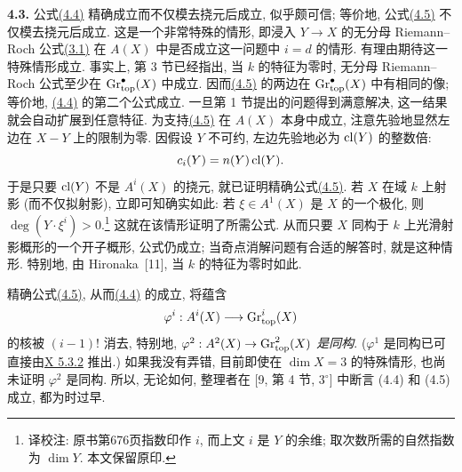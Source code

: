 \noindent{}\textbf{4.3.}
公式\hyperlink{sga6.e14.eq.4-4}{(4.4)} 精确成立而不仅模去挠元后成立, 似乎颇可信; 等价地, 公式\hyperlink{sga6.e14.eq.4-5}{(4.5)} 不仅模去挠元后成立. 这是一个非常特殊的情形, 即浸入 $Y\to X$ 的无分母 Riemann--Roch 公式\hyperlink{sga6.e14.eq.3-1}{(3.1)} 在 $A(X)$ 中是否成立这一问题中 $i=d$ 的情形. 有理由期待这一特殊情形成立. 事实上, 第 3 节已经指出, 当 $k$ 的特征为零时, 无分母 Riemann--Roch 公式至少在 $\operatorname{Gr}_{\mathrm{top}}^\bullet(X)$ 中成立. 因而\hyperlink{sga6.e14.eq.4-5}{(4.5)} 的两边在 $\operatorname{Gr}_{\mathrm{top}}^\bullet(X)$ 中有相同的像; 等价地, \hyperlink{sga6.e14.eq.4-4}{(4.4)} 的第二个公式成立. 一旦第 1 节提出的问题得到满意解决, 这一结果就会自动扩展到任意特征. 为支持\hyperlink{sga6.e14.eq.4-5}{(4.5)} 在 $A(X)$ 本身中成立, 注意先验地显然左边在 $X-Y$ 上的限制为零. 因假设 $Y$ 不可约, 左边先验地必为 $\operatorname{cl}(Y)$ 的整数倍:
\[
 c_i(Y)=n(Y)\operatorname{cl}(Y).
\]
于是只要 $\operatorname{cl}(Y)$ 不是 $A^i(X)$ 的挠元, 就已证明精确公式\hyperlink{sga6.e14.eq.4-5}{(4.5)}. 若 $X$ 在域 $k$ 上射影 (而不仅拟射影), 立即可知确实如此: 若 $\xi\in A^1(X)$ 是 $X$ 的一个极化, 则 $\deg(Y\mathbin{\cdot}\xi^i)>0$.\footnote{译校注: 原书第676页指数印作 $i$, 而上文 $i$ 是 $Y$ 的余维; 取次数所需的自然指数为 $\dim Y$. 本文保留原印.} 这就在该情形证明了所需公式. 从而只要 $X$ 同构于 $k$ 上光滑射影概形的一个开子概形, 公式仍成立; 当奇点消解问题有合适的解答时, 就是这种情形. 特别地, 由 Hironaka~[11], 当 $k$ 的特征为零时如此.

精确公式\hyperlink{sga6.e14.eq.4-5}{(4.5)}, 从而\hyperlink{sga6.e14.eq.4-4}{(4.4)} 的成立, 将蕴含
\[
 \varphi^i:A^i(X)\longrightarrow\operatorname{Gr}_{\mathrm{top}}^i(X)
\]
的核被 $(i-1)!$ 消去, 特别地, \emph{$\varphi^2:A^2(X)\to\operatorname{Gr}_{\mathrm{top}}^2(X)$ 是同构}. ($\varphi^1$ 是同构已可直接由\hyperlink{sga6.e10.thm.5-3-2}{X 5.3.2} 推出.) 如果我没有弄错, 目前即使在 $\dim X=3$ 的特殊情形, 也尚未证明 $\varphi^2$ 是同构. 所以, 无论如何, 整理者在 [9, 第 4 节, $3^\circ$] 中断言 (4.4) 和 (4.5) 成立, 都为时过早.

